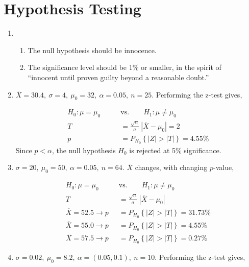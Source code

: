 \chapter{Hypothesis Testing}

\begin{enumerate}
	
	\item 	\begin{enumerate}
		\item The null hypothesis should be innocence.
		
		\item The significance level should be 1\% or smaller, in the spirit of \\
		``innocent until proven guilty beyond a reasonable doubt.''
	\end{enumerate}
	
	\item $ \overline{X} = 30.4 ,\ \sigma = 4,\ \mu_0 = 32,\ \alpha = 0.05,\ n = 25$. Performing the z-test gives,
	
		\begin{align}
			H_0 : \mu = \mu_0 \qquad &\text{vs.} \qquad H_1 : \mu \neq \mu_0 \nonumber \\
			T &= \frac{\sqrt{n}}{\sigma}\ |\overline{X} - \mu_0| = 2 \nonumber \\
			p &= P_{H_0}\left\{|Z| > |T|\right\} = 4.55\% 
		\end{align}
		Since $ p < \alpha $, the null hypothesis $ H_0 $ is rejected at 5\% significance.
	
	
	\item $ \sigma = 20,\ \mu_0 = 50,\ \alpha = 0.05,\ n = 64$. $ \overline{X} $ changes, with changing $ p $-value,
	
		\begin{align}
			H_0 : \mu = \mu_0 \qquad &\text{vs.} \qquad H_1 : \mu \neq \mu_0 \nonumber \\
			T &= \frac{\sqrt{n}}{\sigma}\ |\overline{X} - \mu_0| \nonumber \\
			\overline{X} = 52.5 \to p &= P_{H_0}\left\{|Z| > |T|\right\} = 31.73\% \nonumber \\
			\overline{X} = 55.0 \to p &= P_{H_0}\left\{|Z| > |T|\right\} = 4.55\% \nonumber \\
			\overline{X} = 57.5 \to p &= P_{H_0}\left\{|Z| > |T|\right\} = 0.27\% 
		\end{align}
	
	
	\item $ \sigma = 0.02,\ \mu_0 = 8.2,\ \alpha = (0.05, 0.1),\ n = 10$. Performing the z-test gives,
	

\end{enumerate}
